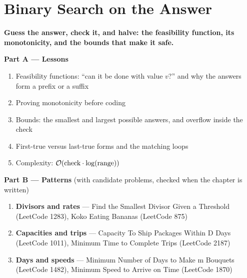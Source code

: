 \chapter{Binary Search on the Answer}
\label{ch:answer_intro}

\begin{tcolorbox}[enhanced, colback=white, colframe=secondaryblue, boxrule=1pt, arc=2mm]
\textbf{\large\textcolor{primaryblue}{Guess the answer, check it, and halve: the feasibility function, its monotonicity, and the bounds that make it safe.}}
\end{tcolorbox}


\begin{plannedbox}
\textbf{Part A --- Lessons}
\begin{enumerate}[leftmargin=*, label=\textbf{A\arabic*.}, itemsep=1pt]
    \item Feasibility functions: ``can it be done with value $v$?'' and why the answers form a prefix or a suffix
    \item Proving monotonicity before coding
    \item Bounds: the smallest and largest possible answers, and overflow inside the check
    \item First-true versus last-true forms and the matching loops
    \item Complexity: $\mathcal{O}(\text{check} \cdot \log(\text{range}))$
\end{enumerate}
\textbf{Part B --- Patterns} (with candidate problems, checked when the chapter is written)
\begin{enumerate}[leftmargin=*, label=\textbf{P\arabic*.}, itemsep=1pt]
    \item \textbf{Divisors and rates} --- Find the Smallest Divisor Given a Threshold {\small\color{darkgray}(LeetCode 1283)}, Koko Eating Bananas {\small\color{darkgray}(LeetCode 875)}
    \item \textbf{Capacities and trips} --- Capacity To Ship Packages Within D Days {\small\color{darkgray}(LeetCode 1011)}, Minimum Time to Complete Trips {\small\color{darkgray}(LeetCode 2187)}
    \item \textbf{Days and speeds} --- Minimum Number of Days to Make m Bouquets {\small\color{darkgray}(LeetCode 1482)}, Minimum Speed to Arrive on Time {\small\color{darkgray}(LeetCode 1870)}
\end{enumerate}
\end{plannedbox}
